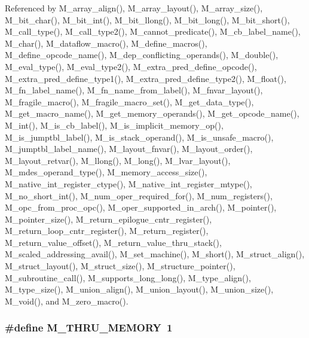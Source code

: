 Referenced by M\_\-array\_\-align(), M\_\-array\_\-layout(), M\_\-array\_\-size(), M\_\-bit\_\-char(), M\_\-bit\_\-int(), M\_\-bit\_\-llong(), M\_\-bit\_\-long(), M\_\-bit\_\-short(), M\_\-call\_\-type(), M\_\-call\_\-type2(), M\_\-cannot\_\-predicate(), M\_\-cb\_\-label\_\-name(), M\_\-char(), M\_\-dataflow\_\-macro(), M\_\-define\_\-macros(), M\_\-define\_\-opcode\_\-name(), M\_\-dep\_\-conflicting\_\-operands(), M\_\-double(), M\_\-eval\_\-type(), M\_\-eval\_\-type2(), M\_\-extra\_\-pred\_\-define\_\-opcode(), M\_\-extra\_\-pred\_\-define\_\-type1(), M\_\-extra\_\-pred\_\-define\_\-type2(), M\_\-float(), M\_\-fn\_\-label\_\-name(), M\_\-fn\_\-name\_\-from\_\-label(), M\_\-fnvar\_\-layout(), M\_\-fragile\_\-macro(), M\_\-fragile\_\-macro\_\-set(), M\_\-get\_\-data\_\-type(), M\_\-get\_\-macro\_\-name(), M\_\-get\_\-memory\_\-operands(), M\_\-get\_\-opcode\_\-name(), M\_\-int(), M\_\-is\_\-cb\_\-label(), M\_\-is\_\-implicit\_\-memory\_\-op(), M\_\-is\_\-jumptbl\_\-label(), M\_\-is\_\-stack\_\-operand(), M\_\-is\_\-unsafe\_\-macro(), M\_\-jumptbl\_\-label\_\-name(), M\_\-layout\_\-fnvar(), M\_\-layout\_\-order(), M\_\-layout\_\-retvar(), M\_\-llong(), M\_\-long(), M\_\-lvar\_\-layout(), M\_\-mdes\_\-operand\_\-type(), M\_\-memory\_\-access\_\-size(), M\_\-native\_\-int\_\-register\_\-ctype(), M\_\-native\_\-int\_\-register\_\-mtype(), M\_\-no\_\-short\_\-int(), M\_\-num\_\-oper\_\-required\_\-for(), M\_\-num\_\-registers(), M\_\-opc\_\-from\_\-proc\_\-opc(), M\_\-oper\_\-supported\_\-in\_\-arch(), M\_\-pointer(), M\_\-pointer\_\-size(), M\_\-return\_\-epilogue\_\-cntr\_\-register(), M\_\-return\_\-loop\_\-cntr\_\-register(), M\_\-return\_\-register(), M\_\-return\_\-value\_\-offset(), M\_\-return\_\-value\_\-thru\_\-stack(), M\_\-scaled\_\-addressing\_\-avail(), M\_\-set\_\-machine(), M\_\-short(), M\_\-struct\_\-align(), M\_\-struct\_\-layout(), M\_\-struct\_\-size(), M\_\-structure\_\-pointer(), M\_\-subroutine\_\-call(), M\_\-supports\_\-long\_\-long(), M\_\-type\_\-align(), M\_\-type\_\-size(), M\_\-union\_\-align(), M\_\-union\_\-layout(), M\_\-union\_\-size(), M\_\-void(), and M\_\-zero\_\-macro().
\subsubsection{\setlength{\rightskip}{0pt plus 5cm}\#define M\_\-THRU\_\-MEMORY~1}\label{m__spec_8h_23a35708f7108bcd91496f584247ed74}




